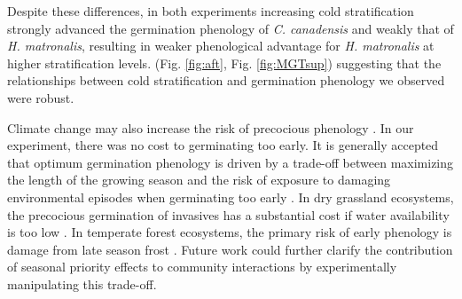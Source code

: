 \documentclass{article}[11pt]
\begin{document}
{Despite these differences, in both experiments increasing cold stratification strongly advanced the germination phenology of \textit{C. canadensis} and weakly that of \textit{H. matronalis}, resulting in weaker phenological advantage for \textit{H. matronalis} at higher stratification levels. (Fig. \ref{fig:aft}, Fig.  \ref{fig:MGTsup}) suggesting that the relationships between cold stratification and germination phenology we observed were robust. 


Climate change may also increase the risk of precocious phenology \citep{Inouye:2000ud}. In our experiment, there was no cost to germinating too early. It is generally accepted that optimum germination phenology is driven by a trade-off between maximizing the length of the growing season and the risk of exposure to damaging environmental episodes when germinating too early \citep{Augspurger:2017vu}. In dry grassland ecosystems, the precocious germination of invasives has a substantial cost if water availability is too low \citep{Wainwright_2011}. In temperate forest ecosystems, the primary risk of early phenology is damage from late season frost \citep{Kollas:2014vn}. Future work could further clarify the contribution of seasonal priority effects to community interactions by experimentally manipulating this trade-off.

}
\end{document}
